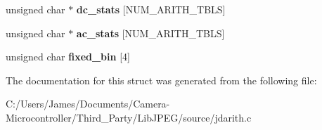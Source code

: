\begin{DoxyCompactItemize}
unsigned char $\ast$ {\bfseries dc\+\_\+stats} \mbox{[}N\+U\+M\+\_\+\+A\+R\+I\+T\+H\+\_\+\+T\+B\+LS\mbox{]}
\item 
\mbox{\label{structarith__entropy__decoder_a6d1dc4cfe4876f9fe0276e6172073fba}} 
unsigned char $\ast$ {\bfseries ac\+\_\+stats} \mbox{[}N\+U\+M\+\_\+\+A\+R\+I\+T\+H\+\_\+\+T\+B\+LS\mbox{]}
\item 
\mbox{\label{structarith__entropy__decoder_a76b5f103286b69e4fa6b22dbf4436f4d}} 
unsigned char {\bfseries fixed\+\_\+bin} \mbox{[}4\mbox{]}
\end{DoxyCompactItemize}


The documentation for this struct was generated from the following file\+:\begin{DoxyCompactItemize}
\item 
C\+:/\+Users/\+James/\+Documents/\+Camera-\/\+Microcontroller/\+Third\+\_\+\+Party/\+Lib\+J\+P\+E\+G/source/jdarith.\+c\end{DoxyCompactItemize}
